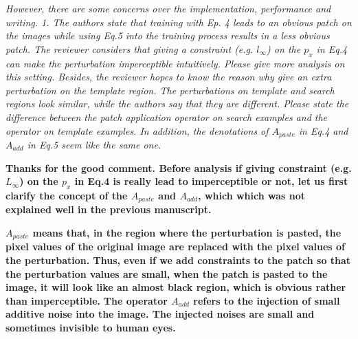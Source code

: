 \documentclass[12pt]{article}
\begin{document}
\textit{However, there are some concerns over the implementation, performance and writing. 1. The authors state that training with Ep. 4 leads to an obvious patch on the images while using Eq.5 into the training process results in a less obvious patch. The reviewer considers that giving a constraint (e.g. $l_{\infty}$) on the $p_x$ in Eq.4 can make the perturbation imperceptible intuitively. Please give more analysis on this setting.
Besides, the reviewer hopes to know the reason why give an extra perturbation on the template region. The perturbations on template and search regions look similar, while the authors say that they are different. Please state the difference between the patch application operator on search examples and the operator on template examples.
In addition, the denotations of $A_{paste}$ in Eq.4 and $A_{add}$ in Eq.5 seem like the same one.
}

\textbf{
Thanks for the good comment.
Before analysis if giving constraint (e.g. $L_{\infty}$) on the $p_x$ in Eq.4 is really lead to imperceptible or not, let us first clarify the concept of the $A_{paste}$ and $A_{add}$, which which was not explained well in the previous manuscript.}

\textbf{%
$A_{paste}$ means that,
in the region where the perturbation is pasted, the pixel values of the original image are replaced with the pixel values of the perturbation.
Thus, even if we add constraints to the patch so that the perturbation values are small, when the patch is pasted to the image, it will look like an almost black region, which is obvious rather than imperceptible.}
\textbf{The operator $A_{add}$ refers to the injection of small additive noise into the image. The injected noises are small and sometimes invisible to human eyes.
}

\end{document}
